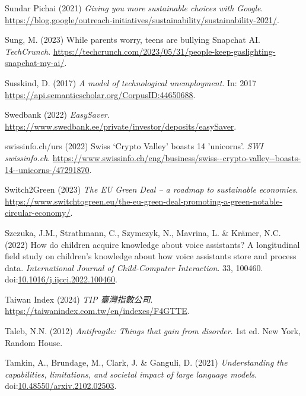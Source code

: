 \documentclass[
  letterpaper,
  DIV=11,
  numbers=noendperiod]{scrartcl}
\newlength{\cslhangindent}
\newenvironment{CSLReferences}[2] %
 {\begin{list}{}{%
  \setlength{\itemindent}{0pt}
  \setlength{\leftmargin}{0pt}
  \setlength{\parsep}{0pt}
  \ifodd #1
   \setlength{\leftmargin}{\cslhangindent}
   \setlength{\itemindent}{-1\cslhangindent}
  \fi
  \setlength{\itemsep}{#2\baselineskip}}}
 {\end{list}}
\begin{document}
\begin{CSLReferences}{0}{1}
Sundar Pichai (2021) \emph{Giving you more sustainable choices with
{Google}}.
\url{https://blog.google/outreach-initiatives/sustainability/sustainability-2021/}.

Sung, M. (2023) While parents worry, teens are bullying {Snapchat AI}.
\emph{TechCrunch}.
\url{https://techcrunch.com/2023/05/31/people-keep-gaslighting-snapchat-my-ai/}.

Susskind, D. (2017) \emph{A model of technological unemployment}. In:
2017 \url{https://api.semanticscholar.org/CorpusID:44650688}.

Swedbank (2022) \emph{{EasySaver}}.
\url{https://www.swedbank.ee/private/investor/deposits/easySaver}.

swissinfo.ch/urs (2022) Swiss {`{Crypto Valley}'} boasts 14 'unicorns'.
\emph{SWI swissinfo.ch}.
\url{https://www.swissinfo.ch/eng/business/swiss--crypto-valley--boasts-14--unicorns-/47291870}.

Switch2Green (2023) \emph{The {EU Green Deal} -- a roadmap to
sustainable economies}.
\url{https://www.switchtogreen.eu/the-eu-green-deal-promoting-a-green-notable-circular-economy/}.

Szczuka, J.M., Strathmann, C., Szymczyk, N., Mavrina, L. \& Krämer, N.C.
(2022) How do children acquire knowledge about voice assistants? {A}
longitudinal field study on children's knowledge about how voice
assistants store and process data. \emph{International Journal of
Child-Computer Interaction}. 33, 100460.
doi:\href{https://doi.org/10.1016/j.ijcci.2022.100460}{10.1016/j.ijcci.2022.100460}.

Taiwan Index (2024) \emph{{TIP} 臺灣指數公司}.
\url{https://taiwanindex.com.tw/en/indexes/F4GTTE}.

Taleb, N.N. (2012) \emph{Antifragile: Things that gain from disorder}.
1st ed. New York, Random House.

Tamkin, A., Brundage, M., Clark, J. \& Ganguli, D. (2021)
\emph{Understanding the capabilities, limitations, and societal impact
of large language models}.
doi:\href{https://doi.org/10.48550/arxiv.2102.02503}{10.48550/arxiv.2102.02503}.


\end{CSLReferences}
\end{document}
